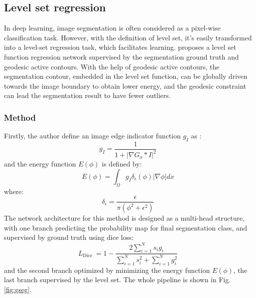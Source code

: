 \documentclass[journal]{IEEEtran}
\begin{document}
\subsection{Level set regression}
In deep learning, image segmentation is often considered as a pixel-wise classification task. However, with the definition of level set, it's easily transformed into a level-set regression task, which facilitates learning. \cite{gsnake} proposes a level set function regression network supervised by the segmentation ground truth and geodesic active contours. With the help of geodesic active contours, the segmentation contour, embedded in the level set function, can be globally driven towards the image boundary to obtain lower energy, and the geodesic constraint can lead the segmentation result to have fewer outliers. 

\subsubsection{Method}
Firstly, the author define an image edge indicator function $g_I$ as :
\begin{equation}
  g_{I}=\frac{1}{1+\left|\nabla G_{\sigma} * I\right|^{2}}
\end{equation}
and the energy function $E(\phi)$ is defined by:
\begin{equation}
  E(\phi)=\int_{\Omega} g_{I} \delta_{\epsilon}(\phi)|\nabla \phi| d x
\end{equation}
where:
\begin{equation}
  \delta_{\epsilon}=\frac{\epsilon}{\pi\left(\phi^{2}+\epsilon^{2}\right)}
\end{equation}
The network architecture for this method is designed as a multi-head structure, with one branch predicting the probability map for final segmentation class, and supervised by ground truth using dice loss:
\begin{equation}
  L_{\text {Dice }}=1-\frac{2 \sum_{i=1}^{N} s_{i} g_{i}}{\sum_{i=1}^{N} s_{i}^{2}+\sum_{i=1}^{N} g_{i}^{2}}
\end{equation}
and the second branch optimized by minimizing the energy function $E(\phi)$, the last branch supervised by the level set. The whole pipeline is shown in Fig. \ref{fig:gseg}.
\end{document}
